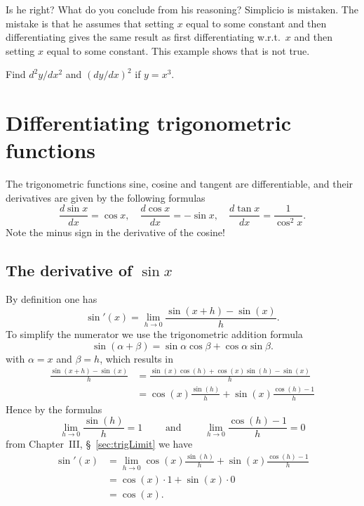 \begin{multicols}{2}
Is he right?  What do you conclude from his reasoning?
\answer 
Simplicio is mistaken.  The mistake is that he assumes that setting $x$
equal to some constant and then differentiating gives the same result as first
differentiating w.r.t.~$x$ and then setting $x$ equal to some constant.  This
example shows that is not true.
\endanswer








\problem  \label{ex:d2ydx2dydx2} Find $d^2y/dx^2$ and 
$(dy/dx)^2$ if $y=x^3$.




















\end{multicols}
\noproblemfont
\section{Differentiating trigonometric functions} 
\label{sec:trigDerivatives}
The trigonometric functions sine, cosine and tangent are differentiable, and
their derivatives are given by the following formulas
\begin{equation}
  \frac{d\sin x}{dx} = \cos x,\quad
  \frac{d\cos x}{dx} = -\sin x,\quad
  \frac{d\tan x}{dx} = \frac1{\cos^2 x}.
\end{equation}
Note the minus sign in the derivative of the cosine!




\subsection{The derivative of $\sin x$} 
\label{sec:deriv-deriv-sin}
By definition one has
\begin{equation}\label{eq:derivation-of-deriv-of-sine}
  \sin'(x)=\lim_{h\to 0}\frac{\sin(x+ h)-\sin(x)}{h} .
\end{equation}
To simplify the numerator we use the trigonometric addition formula
\[
\sin(\alpha+\beta) = \sin\alpha\cos\beta+\cos\alpha\sin\beta.
\]
with $\alpha=x$ and $\beta=h$, which results in
\begin{align*}
  \frac{\sin(x+ h)-\sin(x)}{h} &=
  \frac{\sin(x)\cos(h)+\cos(x)\sin(h)-\sin(x)}{h}\\
  &= \cos(x)\frac{\sin(h)}{h}+\sin(x)\frac{\cos(h)-1}{h}
\end{align*}
Hence by the formulas
\[
\lim_{h\to 0}\frac{\sin(h)}{h} = 1 \qquad\mbox{ and }\qquad
\lim_{h\to 0}\frac{\cos (h)-1}{h} = 0
\]
from Chapter~III, \S~\ref{sec:trigLimit} we have
\begin{align*}
  \sin'(x)
  &= \lim_{h\to 0} \cos(x)\frac{\sin(h)}{h}+\sin(x)\frac{\cos(h)-1}{h}\\
  &= \cos(x) \cdot 1 + \sin(x) \cdot 0\\
  &= \cos(x).
\end{align*}





